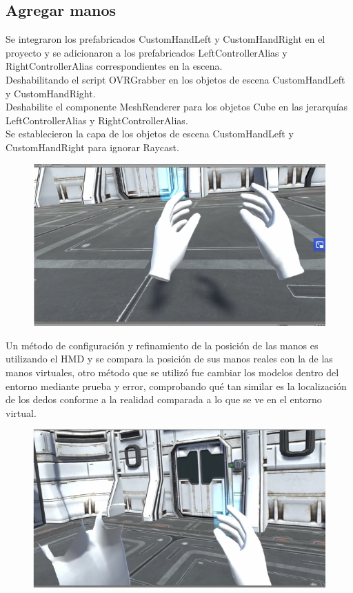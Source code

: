 \subsection{Agregar manos}
Se integraron los prefabricados CustomHandLeft y CustomHandRight en el proyecto y se adicionaron a  los prefabricados LeftControllerAlias y RightControllerAlias 
correspondientes en la escena.\\
Deshabilitando el script OVRGrabber en los objetos de escena CustomHandLeft y CustomHandRight.\\
Deshabilite el componente MeshRenderer para los objetos Cube en las jerarquías LeftControllerAlias y RightControllerAlias.\\
Se establecieron la capa de los objetos de escena CustomHandLeft y CustomHandRight para ignorar Raycast.\\
\begin{figure}[H]
	\begin{center}
 		\includegraphics[width = .5\textwidth]{source/images/image74.png}
	\end{center} 
\end{figure}
Un método de configuración y refinamiento de la posición de las manos es utilizando el  HMD y se compara la posición de sus manos reales con la de las manos virtuales, otro método que se utilizó fue cambiar los modelos dentro del entorno mediante prueba y error, comprobando qué tan similar es la localización de los dedos conforme a la realidad comparada a lo que se ve en el entorno virtual.\\
\begin{figure}[H]
	\begin{center}
 		\includegraphics[width = .5\textwidth]{source/images/image48.png}
	\end{center} 
\end{figure}
